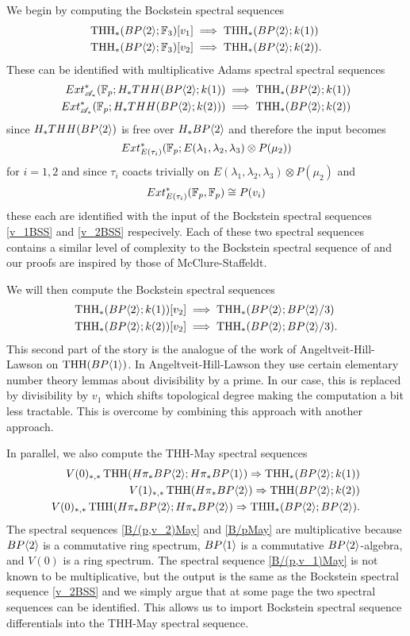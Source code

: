 We begin by computing the  Bockstein spectral sequences
\begin{align}
	\label{v_1BSS}\operatorname{THH}_*(BP\langle 2 \rangle;\mathbb{F}_3)[v_1]&\implies \operatorname{THH}_*(BP\langle 2 \rangle;k(1))\\
	\label{v_2BSS}\operatorname{THH}_*(BP\langle 2 \rangle;\mathbb{F}_3)[v_2]&\implies \operatorname{THH}_*(BP\langle 2 \rangle;k(2)).
\end{align}
These can be identified with multiplicative Adams spectral spectral sequences 
\begin{align}
	\label{v_1ASS}Ext_{\mathscr{A}_*}^*(\mathbb{F}_p;H_*THH(BP\langle 2 \rangle;k(1))&\implies \operatorname{THH}_*(BP\langle 2 \rangle;k(1))\\
	\label{v_2ASS}Ext_{\mathscr{A}_*}^*(\mathbb{F}_p;H_*THH(BP\langle 2 \rangle;k(2)))&\implies \operatorname{THH}_*(BP\langle 2 \rangle;k(2))
\end{align}
since $H_*THH(BP\langle 2 \rangle)$ is free over $H_*BP\langle 2 \rangle$ and therefore the input becomes
\[Ext_{E(\tau_i)}^*(\mathbb{F}_p;E(\lambda_1,\lambda_2,\lambda_3)\otimes P(\mu_2))\]
for $i=1,2$ and since $\tau_i$ coacts trivially on $E(\lambda_1,\lambda_2,\lambda_3)\otimes P(\mu_2)$ and 
\[Ext_{E(\tau_i)}^*(\mathbb{F}_p,\mathbb{F}_p)\cong P(v_i)\] 
these each are identified with the input of the Bockstein spectral sequences \eqref{v_1BSS} and \eqref{v_2BSS} respecively.
Each of these two spectral sequences contains a similar level of complexity to the Bockstein spectral sequence of \cite{McClureStaffeldt} and our proofs are inspired by those of McClure-Staffeldt.

We will then compute the Bockstein spectral sequences 
\begin{align}
	\label{v_1v_2BSS}\operatorname{THH}_*(BP\langle 2 \rangle;k(1))[v_2]&\implies \operatorname{THH}_*(BP\langle 2 \rangle;BP\langle 2 \rangle/3)\\
	\label{v_2v_1BSS}\operatorname{THH}_*(BP\langle 2 \rangle;k(2))[v_2]&\implies \operatorname{THH}_*(BP\langle 2 \rangle;BP\langle 2 \rangle/3).
\end{align}
This second part of the story is the analogue of the work of Angeltveit-Hill-Lawson \cite{AHL} on $\operatorname{THH}(BP\langle 1 \rangle)$. In Angeltveit-Hill-Lawson \cite{AHL} they use certain elementary number theory lemmas about divisibility by a prime. In our case, this is replaced by divisibility by $v_1$ which shifts topological degree making the computation a bit less tractable. This is overcome by combining this approach with another approach. 

In parallel, we also compute the THH-May spectral sequences
\begin{align}
\label{B/(p,v_2)May} V(0)_{*,*}\operatorname{THH}(H\pi_*BP\langle 2 \rangle;H\pi_*BP\langle 1 \rangle)\Rightarrow \operatorname{THH}_*(BP\langle 2 \rangle;k(1))\\
\label{B/(p,v_1)May} V(1)_{*,*}\operatorname{THH}(H\pi_*BP\langle 2 \rangle)\Rightarrow \operatorname{THH}(BP\langle 2 \rangle;k(2))\\
\label{B/pMay}  V(0)_{*,*}\operatorname{THH}(H\pi_*BP\langle 2 \rangle;H\pi_*BP\langle 2 \rangle)\Rightarrow \operatorname{THH}_*(BP\langle 2 \rangle;BP\langle 2 \rangle).
\end{align}
The spectral sequences \eqref{B/(p,v_2)May} and \eqref{B/pMay} are multiplicative because $BP\langle 2 \rangle$ is a commutative ring spectrum, $BP\langle 1 \rangle$ is a commutative $BP\langle 2 \rangle$-algebra, and $V(0)$ is a ring spectrum. The spectral sequence \eqref{B/(p,v_1)May} is not known to be multiplicative, but the output is the same as the Bockstein spectral sequence \eqref{v_2BSS} and we simply argue that at some page the two spectral sequences can be identified. This allows us to import Bockstein spectral sequence differentials into the THH-May spectral sequence. 
